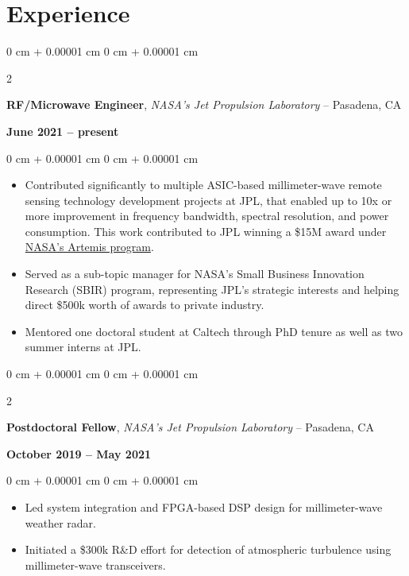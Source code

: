 \documentclass[10pt, letterpaper]{article}
\newenvironment{highlights}{
    \begin{itemize}[
        topsep=0.10 cm,
        parsep=0.10 cm,
        partopsep=0pt,
        itemsep=0pt,
        leftmargin=0 cm + 10pt     
    ]
}{
    \end{itemize}
} %
\newenvironment{onecolentry}{
    \begin{adjustwidth}{
        0 cm + 0.00001 cm
    }{
        0 cm + 0.00001 cm
    }
}{
    \end{adjustwidth}
} %
\newenvironment{twocolentry}[2][]{
    \onecolentry
    \def\secondColumn{#2}
    \setcolumnwidth{\fill, 4.5 cm}
    \begin{paracol}{2}
}{
    \switchcolumn \raggedleft \secondColumn
    \end{paracol}
    \endonecolentry
} %
\begin{document}
        \section{Experience}
        \begin{twocolentry}{
            \textbf{June 2021 – present}
        }
            \textbf{RF/Microwave Engineer}, \textit{NASA's Jet Propulsion Laboratory} -- Pasadena, CA
        \end{twocolentry}
        \vspace{0.30 cm}
        \begin{onecolentry}  
            \justifying
            \begin{highlights}
                \item Contributed significantly to multiple ASIC-based millimeter-wave remote sensing technology development projects at JPL, that enabled up to 10x or more improvement in frequency bandwidth, spectral resolution, and power consumption. This work contributed to JPL winning a \$15M award under  \href{https://www.nasa.gov/news-release/nasa-selects-instruments-for-artemis-lunar-terrain-vehicle/}{NASA's Artemis program}.
                \item Served as a sub-topic manager for NASA's Small Business Innovation Research (SBIR) program, representing JPL's strategic interests and helping direct  \$500k worth of awards to private industry. 
                \item Mentored one doctoral student at Caltech through PhD tenure as well as two summer interns at JPL.  
            \end{highlights}
        \end{onecolentry}

        \vspace{0.4 cm}

        \begin{twocolentry}{
            \textbf{October 2019 – May 2021}
        }
            \textbf{Postdoctoral Fellow}, \textit{NASA's Jet Propulsion Laboratory} -- Pasadena, CA
        \end{twocolentry}
        \vspace{0.30 cm}
        \begin{onecolentry}
            \begin{highlights}
                \item Led system integration and FPGA-based DSP design for millimeter-wave weather radar. 
                \item Initiated a \$300k R\&D effort for detection of atmospheric turbulence using millimeter-wave transceivers.
            \end{highlights}
        \end{onecolentry}
    
\end{document}
